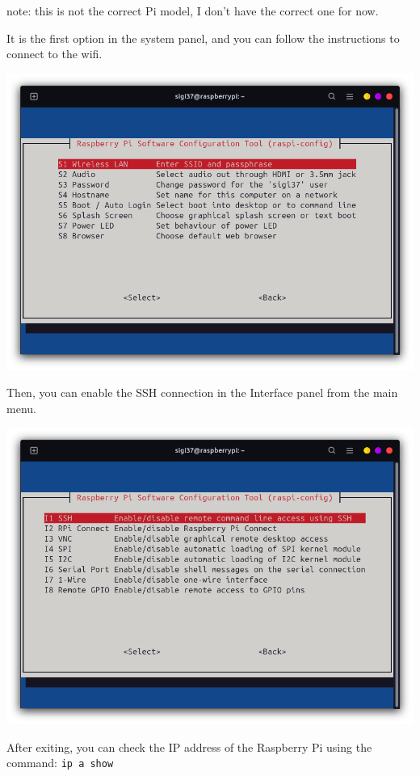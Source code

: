 \documentclass{article}
\begin{document}
note: this is not the correct Pi model, I don't have the correct one for now.

It is the first option in the system panel, and you can follow the instructions to connect to the
wifi.

\includegraphics[scale=0.37]{img/raspi_config_wifi.png}

Then, you can enable the SSH connection in the Interface panel from the main menu.

\includegraphics[scale=0.37]{img/raspi_config_ssh.png}

After exiting, you can check the IP address of the Raspberry Pi using the command:
\texttt{ip a show}
\end{document}
